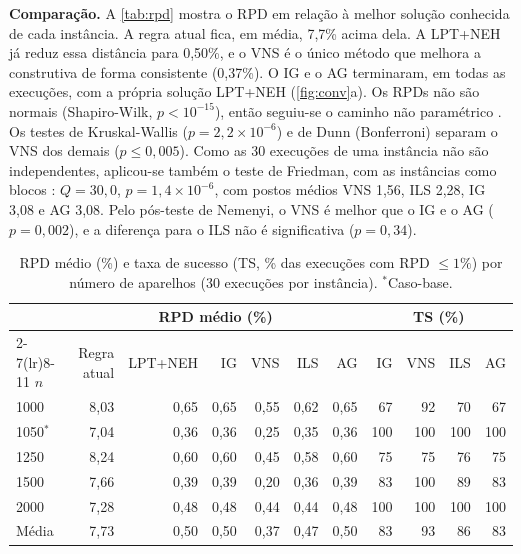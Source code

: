 \textbf{Comparação.} A \autoref{tab:rpd} mostra o RPD em relação à melhor solução conhecida de cada instância. A regra atual fica, em média, 7,7\% acima dela. A LPT+NEH já reduz essa distância para 0,50\%, e o VNS é o único método que melhora a construtiva de forma consistente (0,37\%). O IG e o AG terminaram, em todas as execuções, com a própria solução LPT+NEH (\autoref{fig:conv}a). Os RPDs não são normais (Shapiro-Wilk, $p<10^{-15}$), então seguiu-se o caminho não paramétrico \cite{derrac2011practical}. Os testes de Kruskal-Wallis ($p=2{,}2\times10^{-6}$) e de Dunn (Bonferroni) separam o VNS dos demais ($p\le0{,}005$). Como as 30 execuções de uma instância não são independentes, aplicou-se também o teste de Friedman, com as instâncias como blocos \cite{demsar2006statistical}: $Q=30{,}0$, $p=1{,}4\times10^{-6}$, com postos médios VNS 1,56, ILS 2,28, IG 3,08 e AG 3,08. Pelo pós-teste de Nemenyi, o VNS é melhor que o IG e o AG ($p=0{,}002$), e a diferença para o ILS não é significativa ($p=0{,}34$).

\begin{table}[htb]
    \centering
    \caption{\label{tab:rpd} RPD médio (\%) e taxa de sucesso (TS, \% das execuções com RPD $\le 1\%$) por número de aparelhos (30 execuções por instância). $^*$Caso-base.}
    \small
    \begin{tabular}{lrrrrrrrrrr}
        \toprule
        & \multicolumn{6}{c}{RPD médio (\%)} & \multicolumn{4}{c}{TS (\%)} \\
        \cmidrule(lr){2-7}\cmidrule(lr){8-11}
        $n$ & Regra atual & LPT+NEH & IG & VNS & ILS & AG & IG & VNS & ILS & AG \\
        \midrule
        1000 & 8,03 & 0,65 & 0,65 & 0,55 & 0,62 & 0,65 & 67 & 92 & 70 & 67 \\
        1050$^*$ & 7,04 & 0,36 & 0,36 & 0,25 & 0,35 & 0,36 & 100 & 100 & 100 & 100 \\
        1250 & 8,24 & 0,60 & 0,60 & 0,45 & 0,58 & 0,60 & 75 & 75 & 76 & 75 \\
        1500 & 7,66 & 0,39 & 0,39 & 0,20 & 0,36 & 0,39 & 83 & 100 & 89 & 83 \\
        2000 & 7,28 & 0,48 & 0,48 & 0,44 & 0,44 & 0,48 & 100 & 100 & 100 & 100 \\
        \midrule
        Média & 7,73 & 0,50 & 0,50 & 0,37 & 0,47 & 0,50 & 83 & 93 & 86 & 83 \\
        \bottomrule
    \end{tabular}
\end{table}

